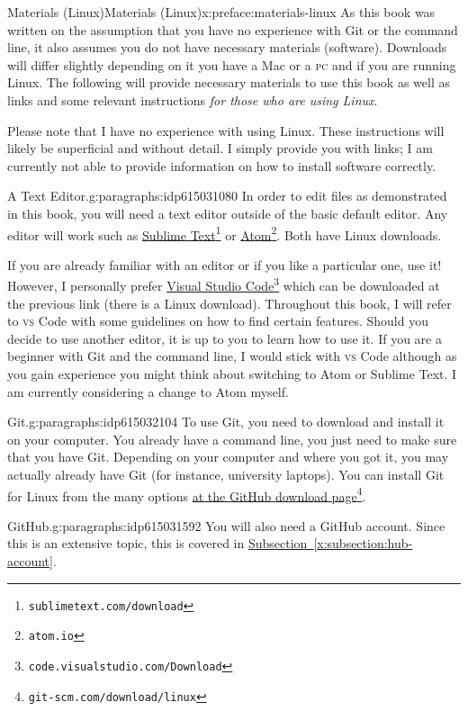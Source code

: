 \documentclass[oneside,10pt,]{book}
\newcommand{\xreffont}{\relax}
\newcommand{\initialism}[1]{\textsc{\MakeLowercase{#1}}}
\begin{document}
\begin{preface}{Materials (Linux)}{}{Materials (Linux)}{}{}{x:preface:materials-linux}
As this book was written on the assumption that you have no experience with Git or the command line, it also assumes you do not have necessary materials (software). Downloads will differ slightly depending on it you have a Mac or a \initialism{PC} and if you are running Linux. The following will provide necessary materials to use this book as well as links and some relevant instructions \emph{for those who are using Linux}.%
\par
Please note that I have no experience with using Linux. These instructions will likely be superficial and without detail. I simply provide you with links; I am currently not able to provide information on how to install software correctly.%
\begin{paragraphs}{A Text Editor.}{g:paragraphs:idp615031080}%
In order to edit files as demonstrated in this book, you will need a text editor outside of the basic default editor. Any editor will work such as \href{https://www.sublimetext.com/download}{Sublime Text}\footnote{\nolinkurl{sublimetext.com/download}\label{g:fn:idp615034536}} or \href{https://atom.io}{Atom}\footnote{\nolinkurl{atom.io}\label{g:fn:idp615033128}}. Both have Linux downloads.%
\par
If you are already familiar with an editor or if you like a particular one, use it! However, I personally prefer \href{}{Visual Studio Code}\footnote{\nolinkurl{code.visualstudio.com/Download}\label{g:fn:idp615032488}} which can be downloaded at the previous link (there is a Linux download). Throughout this book, I will refer to \initialism{VS} Code with some guidelines on how to find certain features. Should you decide to use another editor, it is up to you to learn how to use it. If you are a beginner with Git and the command line, I would stick with \initialism{VS} Code although as you gain experience you might think about switching to Atom or Sublime Text. I am currently considering a change to Atom myself.%
\end{paragraphs}%
\begin{paragraphs}{Git.}{g:paragraphs:idp615032104}%
To use Git, you need to download and install it on your computer. You already have a command line, you just need to make sure that you have Git. Depending on your computer and where you got it, you may actually already have Git (for instance, university laptops). You can install Git for Linux from the many options \href{https://git-scm.com/download/linux}{at the GitHub download page}\footnote{\nolinkurl{git-scm.com/download/linux}\label{g:fn:idp615035304}}.%
\end{paragraphs}%
\begin{paragraphs}{GitHub.}{g:paragraphs:idp615031592}%
You will also need a GitHub account. Since this is an extensive topic, this is covered in \hyperref[x:subsection:hub-account]{Subsection~{\xreffont\ref{x:subsection:hub-account}}}.%
\end{paragraphs}%
\end{preface}
\end{document}

